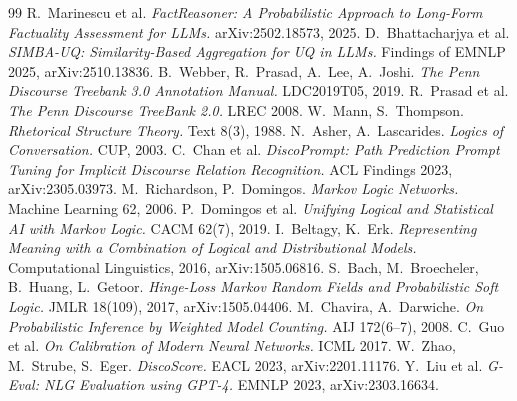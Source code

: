 \documentclass[11pt]{article}
\begin{document}
\begin{thebibliography}{99}\small
{} R.~Marinescu et al.
  \emph{FactReasoner: A Probabilistic Approach to Long-Form Factuality Assessment for LLMs.}
  arXiv:2502.18573, 2025.
 D.~Bhattacharjya et al.
  \emph{SIMBA-UQ: Similarity-Based Aggregation for UQ in LLMs.} Findings of EMNLP 2025,
  arXiv:2510.13836.
 B.~Webber, R.~Prasad, A.~Lee, A.~Joshi.
  \emph{The Penn Discourse Treebank 3.0 Annotation Manual.} LDC2019T05, 2019.
 R.~Prasad et al. \emph{The Penn Discourse TreeBank 2.0.} LREC 2008.
 W.~Mann, S.~Thompson. \emph{Rhetorical Structure Theory.} Text 8(3), 1988.
 N.~Asher, A.~Lascarides. \emph{Logics of Conversation.} CUP, 2003.
 C.~Chan et al.
  \emph{DiscoPrompt: Path Prediction Prompt Tuning for Implicit Discourse Relation
  Recognition.} ACL Findings 2023, arXiv:2305.03973.
 M.~Richardson, P.~Domingos. \emph{Markov Logic Networks.}
  Machine Learning 62, 2006.
 P.~Domingos et al.
  \emph{Unifying Logical and Statistical AI with Markov Logic.} CACM 62(7), 2019.
 I.~Beltagy, K.~Erk.
  \emph{Representing Meaning with a Combination of Logical and Distributional Models.}
  Computational Linguistics, 2016, arXiv:1505.06816.
 S.~Bach, M.~Broecheler, B.~Huang, L.~Getoor.
  \emph{Hinge-Loss Markov Random Fields and Probabilistic Soft Logic.} JMLR 18(109), 2017,
  arXiv:1505.04406.
 M.~Chavira, A.~Darwiche.
  \emph{On Probabilistic Inference by Weighted Model Counting.} AIJ 172(6--7), 2008.
 C.~Guo et al. \emph{On Calibration of Modern Neural Networks.}
  ICML 2017.
 W.~Zhao, M.~Strube, S.~Eger.
  \emph{DiscoScore.} EACL 2023, arXiv:2201.11176.
 Y.~Liu et al. \emph{G-Eval: NLG Evaluation using GPT-4.}
  EMNLP 2023, arXiv:2303.16634.
\end{thebibliography}
\end{document}
